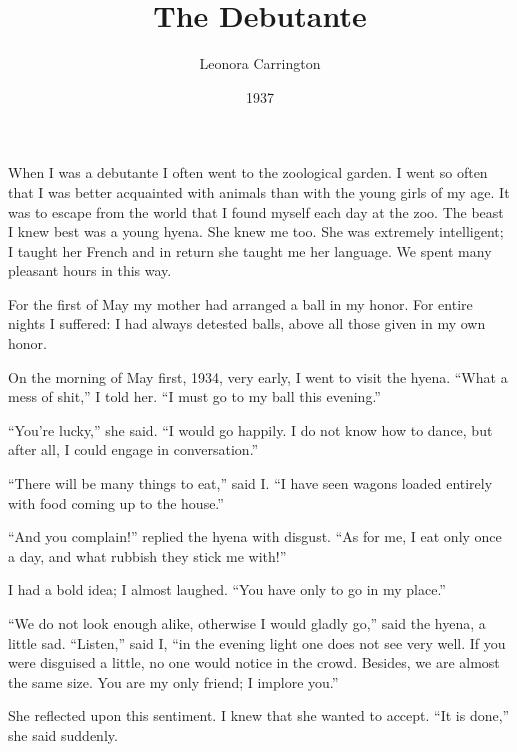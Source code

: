\documentclass[10pt,a4paper]{article}
\begin{document}
\title{The Debutante}
\date{1937}
\author{Leonora Carrington}

\maketitle
    
\noindent\linenumbers When I was a debutante I often went to the zoological garden. I went so often that I was better acquainted with animals than with the young girls of my age. It was to escape from the world that I found myself each day at the zoo. The beast I knew best was a young hyena. She knew me too. She was extremely intelligent; I taught her French and in return she taught me her language. We spent many pleasant hours in this way.

For the first of May my mother had arranged a ball in my honor. For entire nights I suffered: I had always detested balls, above all those given in my own honor.

On the morning of May first, 1934, very early, I went to visit the hyena. “What a mess of shit,” I told her. “I must go to my ball this evening.”

“You’re lucky,” she said. “I would go happily. I do not know how to dance, but after all, I could engage in conversation.”

“There will be many things to eat,” said I. “I have seen wagons loaded entirely with food coming up to the house.”

“And you complain!” replied the hyena with disgust. “As for me, I eat only once a day, and what rubbish they stick me with!”

I had a bold idea; I almost laughed. “You have only to go in my place.”

“We do not look enough alike, otherwise I would gladly go,” said the hyena, a little sad. “Listen,” said I, “in the evening light one does not see very well. If you were disguised a little, no one would notice in the crowd. Besides, we are almost the same size. You are my only friend; I implore you.”

She reflected upon this sentiment. I knew that she wanted to accept. “It is done,” she said suddenly.
\end{document}
